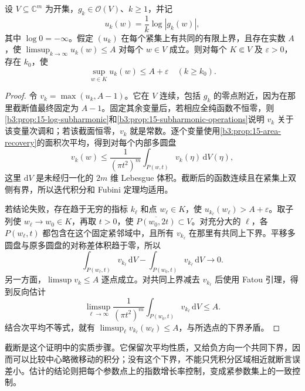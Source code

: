 \begin{lemma}\label{b3:lem:29-hartogs-estimate}
设 \(V\subseteq\mathbb C^m\) 为开集，\(g_k\in\mathcal O(V)\)、\(k\ge1\)，并记
\[
 u_k(w)=\frac1k\log|g_k(w)|,
\]
其中 \(\log0=-\infty\)。假定 \((u_k)\) 在每个紧集上有共同的有限上界，且存在实数 \(A\)，使 \(\limsup_{k\to\infty}u_k(w)\le A\) 对每个 \(w\in V\) 成立。则对每个 \(K\Subset V\) 及 \(\varepsilon>0\)，存在 \(k_0\)，使
\[
 \sup_{w\in K}u_k(w)\le A+\varepsilon\quad(k\ge k_0).
\]
\end{lemma}
\begin{proof}
令 \(v_k=\max(u_k,A-1)\)。它在 \(V\) 连续，包括 \(g_k\) 的零点附近，因为在那里截断值最终固定为 \(A-1\)。固定其余变量后，若相应全纯函数不恒零，则\cref{b3:prop:15-log-subharmonic}和\cref{b3:prop:15-subharmonic-operations}说明 \(v_k\) 关于该变量次调和；若该截面恒零，\(v_k\) 就是常数。逐个变量使用\cref{b3:prop:15-area-recovery}的面积次平均，得到对每个内部多圆盘
\[
 v_k(w)\le\frac1{(\pi t^2)^m}\int_{P(w,t)}v_k(\eta)\,\mathrm{d}V(\eta),
\]
这里 \(\mathrm{d}V\) 是未经归一化的 \(2m\) 维 Lebesgue 体积。截断后的函数连续且在紧集上双侧有界，所以迭代积分和 Fubini 定理均适用。

若结论失败，存在趋于无穷的指标 \(k_\ell\) 和点 \(w_\ell\in K\)，使 \(u_{k_\ell}(w_\ell)>A+\varepsilon\)。取子列使 \(w_\ell\to w_0\in K\)，再取 \(t>0\)，使 \(\overline{P(w_0,2t)}\subset V\)。对充分大的 \(\ell\)，各 \(P(w_\ell,t)\) 都包含在这个固定紧邻域中，且所有 \(v_{k_\ell}\) 在那里有共同上下界。平移多圆盘与原多圆盘的对称差体积趋于零，所以
\[
 \int_{P(w_\ell,t)}v_{k_\ell}\,\mathrm{d}V
 -\int_{P(w_0,t)}v_{k_\ell}\,\mathrm{d}V\longrightarrow0.
\]
另一方面，\(\limsup v_k\le A\) 逐点成立。对共同上界减去 \(v_{k_\ell}\) 后使用 Fatou 引理，得到反向估计
\[
 \limsup_{\ell\to\infty}\frac1{(\pi t^2)^m}
 \int_{P(w_0,t)}v_{k_\ell}\,\mathrm{d}V\le A.
\]
结合次平均不等式，就有 \(\limsup_\ell v_{k_\ell}(w_\ell)\le A\)，与所选点的下界矛盾。
\end{proof}

截断是这个证明中的实质步骤。它保留次平均性质，又给负方向一个共同下界，因而可以比较中心略微移动的积分；没有这个下界，不能只凭积分区域相近就断言误差小。估计的结论则把每个参数点上的指数增长率控制，变成紧参数集上的一致控制。

